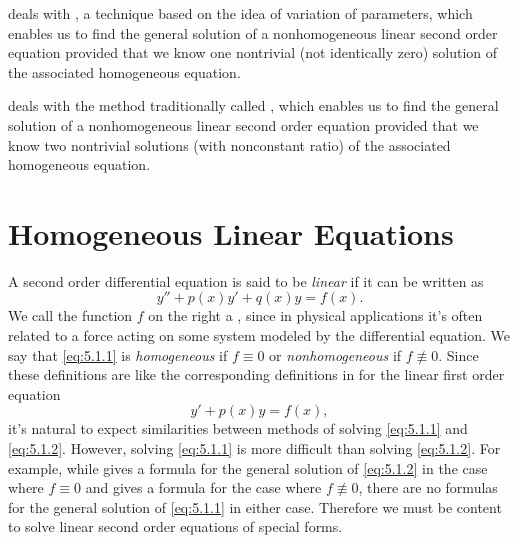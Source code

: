 \medskip\noindent
{} deals with , a
technique based on the idea of variation of parameters,  which
enables us to find the general solution of a nonhomogeneous
linear second order equation provided that we know one nontrivial
(not identically zero) solution of the associated homogeneous
equation.



\medskip\noindent
{}
deals with the method traditionally called
,
which enables us to find the general solution of a nonhomogeneous
linear second order equation provided that we know two nontrivial
solutions (with nonconstant ratio)  of the associated homogeneous
equation.

\newpage


\section{Homogeneous Linear Equations}\label{sec:homog_linear}

A second order differential equation is said to be
\emph{\color{blue}linear}
if it can be written as
\begin{equation}\label{eq:5.1.1}
y''+p(x)y'+q(x)y=f(x).
\end{equation}
We call the function $f$ on the right a ,
since in physical applications it's often related to a force acting
on some system modeled by the differential equation. We say that
\eqref{eq:5.1.1} is \emph{\color{blue}homogeneous} if $f\equiv0$ or
\emph{\color{blue}nonhomogeneous}
if $f\not\equiv0$. Since these definitions are like
the corresponding definitions in  for the linear
first order equation
\begin{equation}\label{eq:5.1.2}
y'+p(x)y=f(x),
\end{equation}
it's natural to expect similarities between methods of solving
\eqref{eq:5.1.1} and \eqref{eq:5.1.2}. However, solving \eqref{eq:5.1.1} is more
difficult than solving \eqref{eq:5.1.2}. For example, while
 gives a formula for the general solution of
\eqref{eq:5.1.2} in the case where $f\equiv0$ and
 gives
a formula for the case where $f\not\equiv0$, there are no formulas for
the general solution of \eqref{eq:5.1.1} in either case. Therefore we must
be content to solve linear second order equations of special forms.

